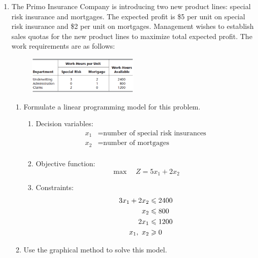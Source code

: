 \documentclass[a4paper]{article}
\begin{document}
\courseheader
{}

\begin{enumerate}
  \setlength{\itemsep}{3\parskip}

  \item The Primo Insurance Company is introducing two new product lines: special risk insurance and mortgages. The expected profit is \$5 per unit on special risk insurance and \$2 per unit on mortgages. Management wishes to establish sales quotas for the new product lines to maximize total expected profit. The work requirements are as follows:
  \begin{figure}[htbp]
  	\centering
  	\includegraphics[width = 0.5\textwidth]{fig3-1-9}
  \end{figure}

    \begin{enumerate}
    \item Formulate a linear programming model for this problem.
     \begin{enumerate}
     	\item Decision variables:
     	\begin{equation*}
     	\begin{aligned}
     	x_1&=\text{number of special risk insurances}\\
     	x_2&=\text{number of mortgages}\\
     	\end{aligned}
     	\end{equation*}
     	\item Objective function:
     	\begin{equation*}
     		\max\quad Z=5x_1+2x_2
     	\end{equation*}
     	\item Constraints:
     	\begin{equation*}
     	\begin{aligned}
     	3x_1+2x_2&\leqslant 2400\\
     	x_2&\leqslant 800\\
     	2x_1&\leqslant 1200\\
     	x_1,\ x_2&\geqslant 0\\
     	\end{aligned}
     	\end{equation*}
     \end{enumerate} 
    \item Use the graphical method to solve this model.
    

\end{enumerate}
\end{enumerate}
\end{document}
